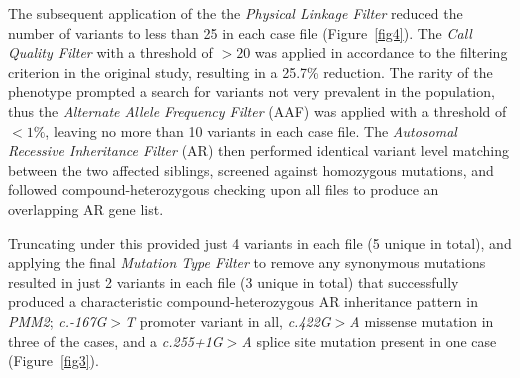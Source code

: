 \documentclass[twocolumn]{bmcart}%
\begin{document}
The subsequent application of the the \textit{Physical Linkage Filter} reduced the number of variants to less than 25 in each case file (Figure~\ref{fig4}). The \textit{Call Quality Filter} with a threshold of $>20$ was applied in accordance to the filtering criterion in the original study, resulting in a 25.7\% reduction. The rarity of the phenotype prompted a search for variants not very prevalent in the population, thus the \textit{Alternate Allele Frequency Filter} (AAF) was applied with a threshold of $< 1\%$, leaving no more than 10 variants in each case file. The \textit{Autosomal Recessive Inheritance Filter} (AR) then performed identical variant level matching between the two affected siblings, screened against homozygous mutations, and followed compound-heterozygous checking upon all files to produce an overlapping AR gene list. 

Truncating under this provided just 4 variants in each file (5 unique in total), and applying the final \textit{Mutation Type Filter} to remove any synonymous mutations resulted in just 2 variants in each file (3 unique in total) that successfully produced a characteristic compound-heterozygous AR inheritance pattern in \textit{PMM2}; \textit{c.-167G}$>$\textit{T} promoter variant in all, \textit{c.422G}$>$\textit{A} missense mutation in three of the cases, and a \textit{c.255+1G}$>$\textit{A} splice site mutation present in one case (Figure~\ref{fig3}).

\end{document}
